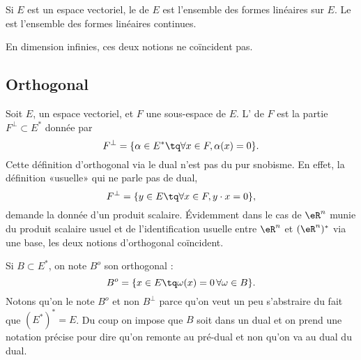 \begin{definition}
    Si \( E\) est un espace vectoriel, le  de \( E\) est l'ensemble des formes linéaires sur \( E\). Le  est l'ensemble des formes linéaires continues.

    En dimension infinies, ces deux notions ne coïncident pas.
\end{definition}

\subsection{Orthogonal}

Soit \( E\), un espace vectoriel, et \( F\) une sous-espace de \( E\). L' de \( F\) est la partie \( F^{\perp}\subset E^*\) donnée par
\begin{equation}    \label{Eqiiyple}
    F^{\perp}=\{ \alpha\in E^*\tq \forall x\in F,\alpha(x)=0 \}.
\end{equation}
Cette définition d'orthogonal via le dual n'est pas du pur snobisme. En effet, la définition «usuelle» qui ne parle pas de dual,
\begin{equation}
    F^{\perp}=\{ y\in E\tq \forall x\in F,y\cdot x=0 \},
\end{equation}
demande la donnée d'un produit scalaire. Évidemment dans le cas de \( \eR^n\) munie du produit scalaire usuel et de l'identification usuelle entre \( \eR^n\) et \( (\eR^n)^*\) via une base, les deux notions d'orthogonal coïncident.

Si \( B\subset E^*\), on note \( B^o\) son orthogonal :
\begin{equation}
    B^o=\{ x\in E\tq \omega(x)=0\,\forall \omega\in B \}.
\end{equation}
Notons qu'on le note \( B^o\) et non \( B^{\perp}\) parce qu'on veut un peu s'abstraire du fait que \( (E^*)^*=E\). Du coup on impose que \( B\) soit dans un dual et on prend une notation précise pour dire qu'on remonte au pré-dual et non qu'on va au dual du dual.

